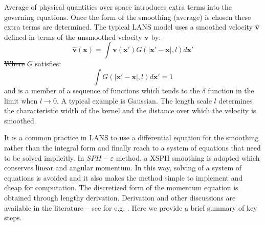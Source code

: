 \documentclass[gmd, manuscript]{copernicus} %
\providecommand{\DIFadd}[1]{{\protect\color{blue}\uwave{#1}}} %
\providecommand{\DIFdel}[1]{{\protect\color{red}\sout{#1}}}                      %
\providecommand{\DIFaddbegin}{} %
\providecommand{\DIFaddend}{} %
\providecommand{\DIFdelbegin}{} %
\providecommand{\DIFdelend}{} %
\begin{document}
Average of physical quantities over space introduces extra terms into the governing equations. Once the form of the smoothing (average) is chosen these extra terms are determined.
The typical LANS model uses a smoothed velocity $\widehat{\textbf{v}}$ 
defined in terms of the unsmoothed velocity $\textbf{v}$ by:
\begin{equation}
\widehat{\textbf{v}}\left(\textbf{x}\right)=\int \textbf{v}\left(\textbf{x} \prime\right)G\left(\vert \textbf{x} \prime - \textbf{x} \vert, l\right) d\textbf{x} \prime
\end{equation}
\DIFdelbegin \DIFdel{Where }\DIFdelend \DIFaddbegin \DIFadd{where }\DIFaddend $G$ satisfies:
\begin{equation}
\int G\left(\vert \textbf{x} \prime - \textbf{x} \vert, l\right) d\textbf{x} \prime =1
\end{equation}
and is a member of a sequence of functions which tends to the $\delta$ function in the limit when $ l\rightarrow 0$. A typical example is Gaussian.
The length scale $l$ determines the characteristic width of the kernel and the distance over which the velocity is smoothed.

It is a common practice in LANS to use a differential equation for the smoothing rather than the integral form and finally reach to a system of equations that need to be solved implicitly. In $SPH-\varepsilon$ method, a XSPH \citep{monaghan1989problem} smoothing is adopted which conserves linear and angular momentum. In this way, solving of a system of equations is avoided and it also makes the method simple to implement and cheap for computation. 
The discretized form of the momentum equation is obtained through lengthy derivation. Derivation and other discussions are available in the literature -- see for e.g. \citep{monaghan2011turbulence}. Here we provide a brief summary of key steps.
\end{document}
